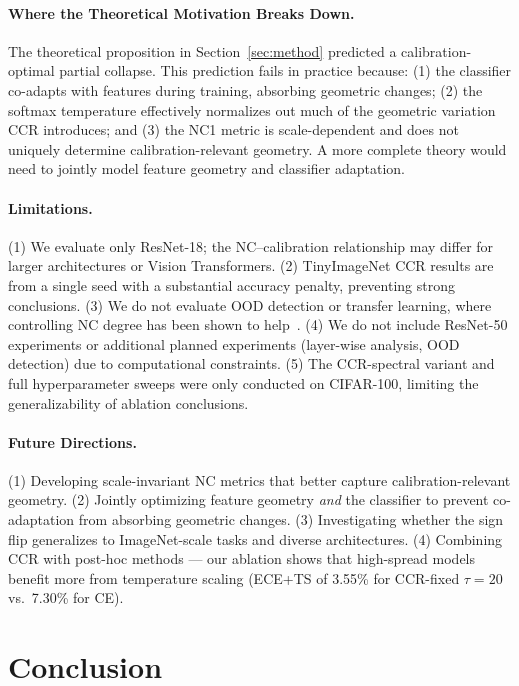 \documentclass{article}
\begin{document}
\paragraph{Where the Theoretical Motivation Breaks Down.}
The theoretical proposition in Section~\ref{sec:method} predicted a calibration-optimal partial collapse. This prediction fails in practice because: (1) the classifier co-adapts with features during training, absorbing geometric changes; (2) the softmax temperature effectively normalizes out much of the geometric variation CCR introduces; and (3) the NC1 metric is scale-dependent and does not uniquely determine calibration-relevant geometry. A more complete theory would need to jointly model feature geometry and classifier adaptation.

\paragraph{Limitations.}
(1) We evaluate only ResNet-18; the NC--calibration relationship may differ for larger architectures or Vision Transformers. (2) TinyImageNet CCR results are from a single seed with a substantial accuracy penalty, preventing strong conclusions. (3) We do not evaluate OOD detection or transfer learning, where controlling NC degree has been shown to help~\citep{harun2025controlling}. (4) We do not include ResNet-50 experiments or additional planned experiments (layer-wise analysis, OOD detection) due to computational constraints. (5) The CCR-spectral variant and full hyperparameter sweeps were only conducted on CIFAR-100, limiting the generalizability of ablation conclusions.

\paragraph{Future Directions.}
(1) Developing scale-invariant NC metrics that better capture calibration-relevant geometry. (2) Jointly optimizing feature geometry \emph{and} the classifier to prevent co-adaptation from absorbing geometric changes. (3) Investigating whether the sign flip generalizes to ImageNet-scale tasks and diverse architectures. (4) Combining CCR with post-hoc methods --- our ablation shows that high-spread models benefit more from temperature scaling (ECE+TS of 3.55\% for CCR-fixed $\tau=20$ vs.\ 7.30\% for CE).

\section{Conclusion}
\end{document}
